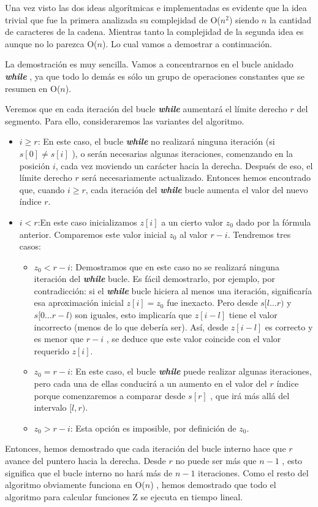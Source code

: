 Una vez visto las dos ideas algorítmicas e implementadas es evidente que la idea trivial que fue la primera analizada su complejidad de O($n^2$) siendo $n$ la cantidad de caracteres de la cadena. Mientras tanto la complejidad de la segunda idea es aunque no lo parezca O($n$). Lo cual vamos a demostrar a continuación.

La demostración es muy sencilla. Vamos a concentrarnos en el bucle anidado \textbf{\emph{while}} , ya que todo lo demás es sólo un grupo de operaciones constantes que se resumen en O($n$).

Veremos que en cada iteración del bucle \textbf{\emph{while}}  aumentará el límite derecho $r$ del segmento. Para ello, consideraremos las variantes del algoritmo.

\begin{itemize}
	\item $i \ge r$: En este caso, el bucle \textbf{\emph{while}} no realizará ninguna iteración (si $s[0] \neq s[i]$ ), o serán necesarias algunas iteraciones, comenzando en la posición $i$, cada vez moviendo un carácter hacia la derecha. Después de eso, el límite derecho $r$ será necesariamente actualizado. Entonces hemos encontrado que, cuando $i \ge r$, cada iteración del \textbf{\emph{while}} bucle aumenta el valor del nuevo índice $r$.
	\item $i < r$:En este caso inicializamos $z[i]$ a un cierto valor $z_0$ dado por la fórmula anterior. Comparemos este valor inicial $z_0$ al valor $r-i$. Tendremos tres casos:
	\begin{itemize}
		\item $z_0 < r-i$: Demostramos que en este caso no se realizará ninguna iteración del \textbf{\emph{while}} bucle.
		Es fácil demostrarlo, por ejemplo, por contradicción: si el \textbf{\emph{while}} bucle hiciera al menos una iteración, significaría esa aproximación inicial $z[i] = z_0$ fue inexacto. Pero desde $s[l \dots r)$ y $s[0 \dots r-l)$ son iguales, esto implicaría que $z[i-l]$ tiene el valor incorrecto (menos de lo que debería ser). Así, desde $z[i-l]$ es correcto y es menor que $r-i$ , se deduce que este valor coincide con el valor requerido $z[i]$.
		\item $z_0 = r-i$: En este caso, el bucle \textbf{\emph{while}} puede realizar algunas iteraciones, pero cada una de ellas conducirá a un aumento en el valor del $r$ índice porque comenzaremos a comparar desde $s[r]$ , que irá más allá del intervalo $[l, r)$.
		\item $z_0 > r-i$: Esta opción es imposible, por definición de $z_0$.
	\end{itemize} 
\end{itemize}

Entonces, hemos demostrado que cada iteración del bucle interno hace que $r$ avance del puntero hacia la derecha. Desde $r$ no puede ser más que
$n-1$ , esto significa que el bucle interno no hará más de $n-1$ iteraciones. Como el resto del algoritmo obviamente funciona en O($n$) , hemos demostrado que todo el algoritmo para calcular funciones Z se ejecuta en tiempo lineal.

